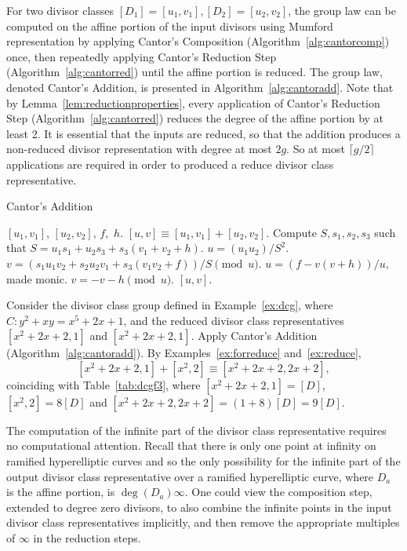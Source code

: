 For two divisor classes $[D_1] = [u_1,v_1], [D_2] = [u_2,v_2]$, the group law
can be computed on the affine portion of the input divisors using Mumford
representation by applying Cantor's Composition (Algorithm~\ref{alg:cantorcomp})
once, then repeatedly applying Cantor's Reduction Step
(Algorithm~\ref{alg:cantorred}) until the affine portion is reduced. The group
law, denoted Cantor's Addition, is presented in Algorithm~\ref{alg:cantoradd}.
Note that by Lemma~\ref{lem:reductionproperties}, every application of Cantor's
Reduction Step (Algorithm~\ref{alg:cantorred}) reduces the degree of the affine
portion by at least 2. It is essential that the inputs are reduced, so that the
addition produces a non-reduced divisor representation with degree at most $2g$.
So at most $\lceil g/2 \rceil$ applications are required in order to
produced a reduce divisor class representative. 

\begin{algorithm}[ht]
  \caption{Cantor's Addition}
  \label{alg:cantoradd}
  {\fontsize{12}{18}\selectfont
  \begin{algorithmic}[1]
  \Require $[u_1,v_1]$, $[u_2,v_2]$, $f,$ $h.$
  \Ensure $[u,v] \equiv [u_1,v_1] + [u_2,v_2]$.
  \vspace{5pt}
    \State Compute $S,s_1,s_2,s_3$ such that $S = u_1s_1 + u_2s_3 + s_3(v_1 + v_2 + h)$.
    \State $u = (u_1u_2)/S^2$.
    \State $v = (s_1u_1v_2 + s_2u_2v_1 + s_3(v_1v_2 + f))/S \pmod{u}$.
    \State $u = (f-v(v + h))/u,$ made monic. 
    \State $v = -v-h \pmod{u}$.
  \EndWhile
  \State \Return $[u,v]$.
  \end{algorithmic}
  }
\end{algorithm}

\be
Consider the divisor class group defined in Example~\ref{ex:dcg}, where $C : y^2
+ xy = x^5 + 2x + 1$, and the reduced divisor class representatives
$[x^2 + 2x + 2,1]$ and $[x^2 + 2x + 2,1]$. Apply Cantor's Addition
(Algorithm~\ref{alg:cantoradd}). By Examples~\ref{ex:forreduce}
and~\ref{ex:reduce}, $$[x^2 + 2x + 2,1] + [x^2,2] \equiv [x^2 + 2x + 2, 2x +
2],$$ coinciding with Table~\ref{tab:dcgf3}, where $[x^2 + 2x + 2,1] = [D]$,
$[x^2,2] = 8[D]$ and  $[x^2 + 2x + 2, 2x + 2] = (1 + 8)[D] = 9[D]$.
\ee


The computation of the infinite part of the divisor class representative
requires no computational attention. Recall that there is only one point at
infinity on ramified hyperelliptic curves and so the only possibility for the
infinite part of the output divisor class representative over a ramified
hyperelliptic curve, where $D_a$ is the affine portion, is $\deg(D_a)\infty$.
One could view the composition step, extended to degree zero divisors, to also
combine the infinite points in the input divisor class representatives
implicitly, and then remove the appropriate multiples of $\infty$ in the
reduction steps. 

